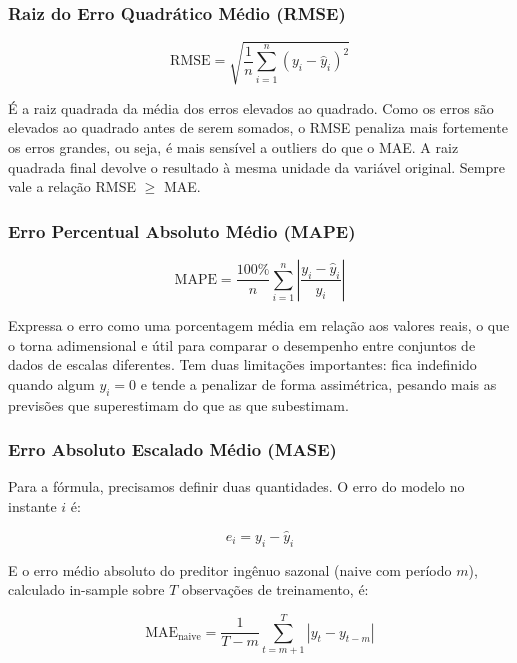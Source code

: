 \documentclass[
    12pt,                %
    openright,           %
    oneside,             %
    a4paper,             %
    english,             %
    brazil               %
]{abntex2}
\begin{document}
\subsubsection{Raiz do Erro Quadrático Médio (RMSE)}
\label{subsec:rmse}

\begin{equation}
\text{RMSE} = \sqrt{\frac{1}{n}\sum_{i=1}^{n}\left(y_i - \hat{y}_i\right)^2}
\end{equation}

É a raiz quadrada da média dos erros elevados ao quadrado. Como os erros são elevados ao quadrado antes de serem somados, o RMSE penaliza mais fortemente os erros grandes, ou seja, é mais sensível a outliers do que o MAE. A raiz quadrada final devolve o resultado à mesma unidade da variável original. Sempre vale a relação RMSE $\geq$ MAE.

\subsubsection{Erro Percentual Absoluto Médio (MAPE)}
\label{subsec:mape}

\begin{equation}
\text{MAPE} = \frac{100\%}{n}\sum_{i=1}^{n}\left|\frac{y_i - \hat{y}_i}{y_i}\right|
\end{equation}

Expressa o erro como uma porcentagem média em relação aos valores reais, o que o torna adimensional e útil para comparar o desempenho entre conjuntos de dados de escalas diferentes. Tem duas limitações importantes: fica indefinido quando algum $y_i = 0$ e tende a penalizar de forma assimétrica, pesando mais as previsões que superestimam do que as que subestimam.

\subsubsection{Erro Absoluto Escalado Médio (MASE)}
\label{subsec:mase}

Para a fórmula, precisamos definir duas quantidades. O erro do modelo no instante $i$ é:

\begin{equation}
e_i = y_i - \hat{y}_i
\end{equation}

E o erro médio absoluto do preditor ingênuo sazonal (naive com período $m$), calculado in-sample sobre $T$ observações de treinamento, é:

\begin{equation}
\text{MAE}_{\text{naive}} = \frac{1}{T-m}\sum_{t=m+1}^{T}\left|y_t - y_{t-m}\right|
\end{equation}
\end{document}
